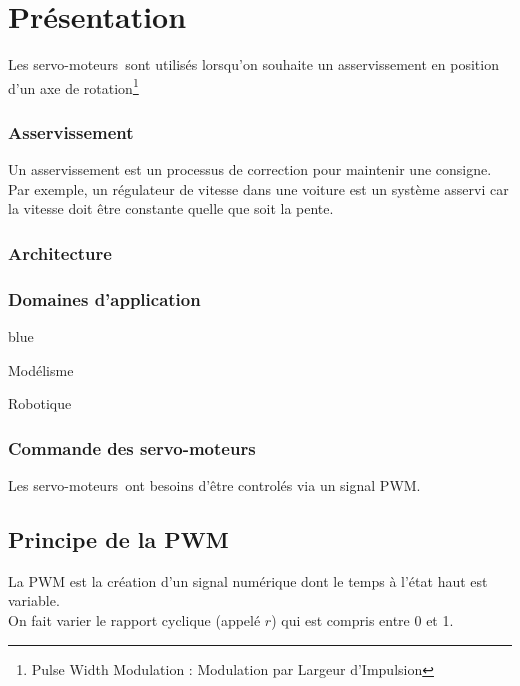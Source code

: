 \chapter{Présentation}

\newcommand{\servo}{servo-moteurs~}

Les \servo sont utilisés lorsqu'on souhaite un asservissement en position d'un axe de rotation\footnote{Pulse Width Modulation : Modulation par Largeur d'Impulsion}


\subsection{Asservissement}

Un asservissement est un processus de correction pour maintenir une consigne. \\
Par exemple, un régulateur de vitesse dans une voiture est un système asservi car la vitesse doit être constante quelle que soit la pente.


\subsection{Architecture}


\subsection{Domaines d'application}

\begin{items}{blue}{\Bullet}
    \item Modélisme
    \item Robotique
\end{items}

\subsection{Commande des \servo}

Les \servo ont besoins d'être controlés via un signal PWM.

\section{Principe de la PWM}

La PWM est la création d'un signal numérique dont le temps à l'état haut est variable.\\
On fait varier le rapport cyclique (appelé $r$) qui est compris entre 0 et 1.

